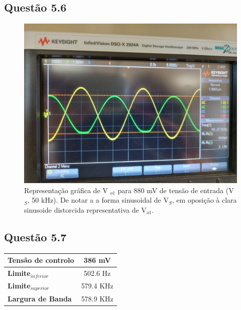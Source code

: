 \documentclass[a4paper,12pt]{article}
\begin{document}
			\clearpage
			\subsection{Questão 5.6}
					   \begin{figure}[H]
                                          \centering
                                          \captionsetup{justification=centering}
                                          \includegraphics[scale=0.2\textscale]  {5.6.jpeg}
                                          \caption{Representação gráfica de V  $_{o1}$ para 880 mV de tensão de entrada (V$_S$, 50 kHz). De notar a a forma sinusoidal de V$_S$, em oposição à clara sinusoide distorcida representativa de V$_{o1}$.}
                                  \end{figure}
			\subsection{Questão 5.7}
				\begin{table}[H]
                                            \centering
                                            \begin{tabular}{|l|c|}
                                                    \hline
						    \textbf{Tensão de controlo} & 386 mV \\ \hline
                                                    \textbf{Limite}$_{inferior}$  & 502.6 Hz \\ \hline
                                                    \textbf{Limite}$_{superior}$ &  579.4 KHz\\ \hline
                                                    \textbf{Largura de Banda} &  578.9 KHz\\ \hline
                                                    
                                            \end{tabular}

                                    \end{table}
		\clearpage
\end{document}
